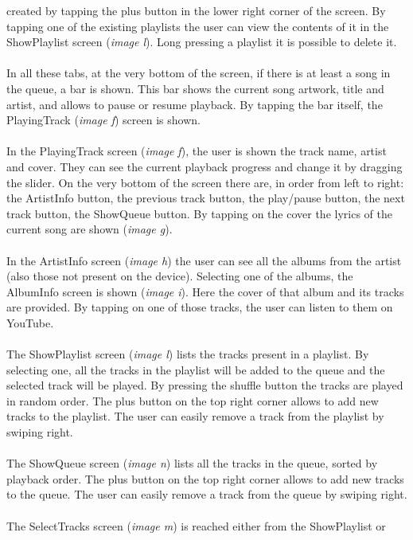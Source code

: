 \documentclass{article}
\begin{document}
created by tapping the plus button in the lower right corner of the screen. By
tapping one of the existing playlists the user can view the contents of it in
the ShowPlaylist screen (\textit{image l}). Long pressing a playlist it is possible to
delete it.
\\\\
In all these tabs, at the very bottom of the screen, if there is at least a song
in the queue, a bar is shown. This bar shows the current song artwork, title and
artist, and allows to pause or resume playback. By tapping the bar itself, the
PlayingTrack (\textit{image f}) screen is shown.
\\\\
In the PlayingTrack screen (\textit{image f}), the user is shown the track name, artist
and cover. They can see the current playback progress and change it by
dragging the slider. On the very bottom of the screen there are, in order from
left to right: the ArtistInfo button, the previous track button, the play/pause
button, the next track button, the ShowQueue button.
By tapping on the cover the lyrics of the current song are shown (\textit{image g}).
\\\\
In the ArtistInfo screen (\textit{image h}) the user can see all the albums from the
artist (also those not present on the device). Selecting one of the albums, the
AlbumInfo screen is shown (\textit{image i}). Here the cover of that album and its tracks
are provided. By tapping on one of those tracks, the user can listen to them on
YouTube.
\\\\
The ShowPlaylist screen (\textit{image l}) lists the tracks present in a playlist. By
selecting one, all the tracks in the playlist will be added to the queue and the
selected track will be played. By pressing the shuffle button the tracks are
played in random order. The plus button on the top right corner allows to add
new tracks to the playlist. The user can easily remove a track from the playlist
by swiping right.
\\\\
The ShowQueue screen (\textit{image n}) lists all the tracks in the queue, sorted by
playback order. The plus button on the top right corner allows to add new tracks
to the queue. The user can easily remove a track from the queue by swiping
right. 
\\\\
The SelectTracks screen (\textit{image m}) is reached either from the ShowPlaylist or
\end{document}
